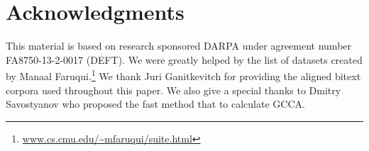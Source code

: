 \documentclass[11pt]{article}
\begin{document}
\section*{Acknowledgments}
This material is based on research sponsored DARPA under agreement
number FA8750-13-2-0017 (DEFT). We were greatly helped by
the list of datasets created by Manaal
Faruqui.\footnote{\url{www.cs.cmu.edu/~mfaruqui/suite.html}}
We thank Juri Ganitkevitch for providing the aligned bitext corpora
used throughout this paper. We also give a special thanks to Dmitry Savostyanov
who proposed the fast method that to calculate GCCA.



\end{document}
